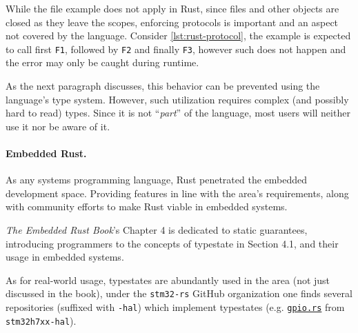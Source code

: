 While the file example does not apply in Rust, since files and other objects are closed as they leave the scopes,
enforcing protocols is important and an aspect not covered by the language.
Consider \autoref{lst:rust-protocol}, the example is expected to call first \texttt{F1}, followed by \texttt{F2} and finally \texttt{F3},
however such does not happen and the error may only be caught during runtime.



As the next paragraph discusses, this behavior can be prevented using the language's type system.
However, such utilization requires complex (and possibly hard to read) types.
Since it is not “\emph{part}” of the language, most users will neither use it nor be aware of it.

\paragraph{Embedded Rust.} As any systems programming language, Rust penetrated the embedded development space.
Providing features in line with the area's requirements, along with community efforts to make Rust viable in embedded systems.

\emph{The Embedded Rust Book}'s Chapter 4 is dedicated to static guarantees,
introducing programmers to the concepts of typestate in Section 4.1, and their usage in embedded systems.

As for real-world usage, typestates are abundantly used in the area (not just discussed in the book),
under the \texttt{stm32-rs} GitHub organization one finds several repositories (suffixed with \texttt{-hal})
which implement typestates
(e.g. \href{https://github.com/stm32-rs/stm32h7xx-hal/blob/master/src/gpio.rs#L51-L128}{\texttt{gpio.rs}}
from \texttt{stm32h7xx-hal}).

